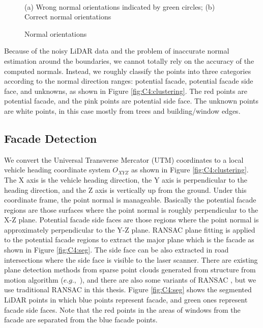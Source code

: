 \begin{figure}[H]
\centering
{} 
\hspace{.1in}
 \\
\label{fig:C4:normals}

\caption{Normal orientations} {(a) Wrong normal orientations indicated by green circles; (b) Correct normal orientations}

\end{figure}

Because of the noisy LiDAR data and the problem of inaccurate normal estimation around the boundaries, we cannot totally rely on the accuracy of the computed normals. Instead, we roughly classify the points into three categories according to the normal direction ranges: potential facade, potential facade side face, and unknowns, as shown in Figure \ref{fig:C4:clustering}. The red points are potential facade, and the pink points are potential side face. The unknown points are white points, in this case mostly from trees and building/window edges.

\subsection{Facade Detection}

We convert the Universal Transverse Mercator (UTM) coordinates to a local vehicle heading coordinate system $O_{XYZ}$ as shown in Figure \ref{fig:C4:clustering}. The X axis is the vehicle heading direction, the Y axis is perpendicular to the heading direction, and the Z axis is vertically up from the ground. Under this coordinate frame, the point normal is manageable. Basically the potential facade regions are those surfaces where the point normal is roughly perpendicular to the X-Z plane. Potential facade side faces are those regions where the point normal is approximately perpendicular to the Y-Z plane. RANSAC plane fitting is applied to the potential facade regions to extract the major plane which is the facade as shown in Figure \ref{fig:C4:seg}. The side face can be also extracted in road intersections where the side face is visible to the laser scanner. There are existing plane detection methods from sparse point clouds generated from structure from motion algorithm ($e.g.,$ \cite{SinhaSzeliski09}), and there are also some variants of RANSAC \cite{Raguram08}, but we use traditional RANSAC in this thesis. Figure \ref{fig:C4:seg} shows the segmented LiDAR points in which blue points represent facade, and green ones represent facade side faces. Note that the red points in the areas of windows from the facade are separated from the blue facade points. 

